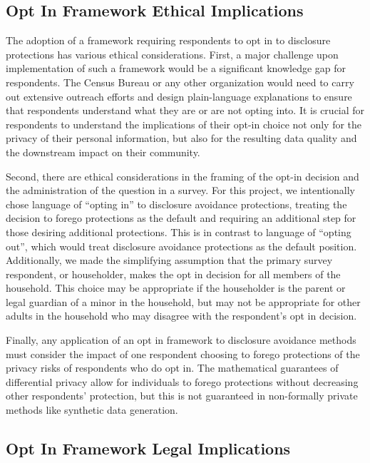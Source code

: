 \documentclass[
]{urban-formatting}
\begin{document}
\subsection{Opt In Framework Ethical Implications}

The adoption of a framework requiring respondents to opt in to
disclosure protections has various ethical considerations. First, a
major challenge upon implementation of such a framework would be a
significant knowledge gap for respondents. The Census Bureau or any
other organization would need to carry out extensive outreach efforts
and design plain-language explanations to ensure that respondents
understand what they are or are not opting into. It is crucial for
respondents to understand the implications of their opt-in choice not
only for the privacy of their personal information, but also for the
resulting data quality and the downstream impact on their community.

Second, there are ethical considerations in the framing of the opt-in
decision and the administration of the question in a survey. For this
project, we intentionally chose language of ``opting in'' to disclosure
avoidance protections, treating the decision to forego protections as
the default and requiring an additional step for those desiring
additional protections. This is in contrast to language of ``opting
out'', which would treat disclosure avoidance protections as the default
position. Additionally, we made the simplifying assumption that the
primary survey respondent, or householder, makes the opt in decision for
all members of the household. This choice may be appropriate if the
householder is the parent or legal guardian of a minor in the household,
but may not be appropriate for other adults in the household who may
disagree with the respondent's opt in decision.

Finally, any application of an opt in framework to disclosure avoidance
methods must consider the impact of one respondent choosing to forego
protections of the privacy risks of respondents who do opt in. The
mathematical guarantees of differential privacy allow for individuals to
forego protections without decreasing other respondents' protection, but
this is not guaranteed in non-formally private methods like synthetic
data generation.

\subsection{Opt In Framework Legal Implications}
\end{document}
